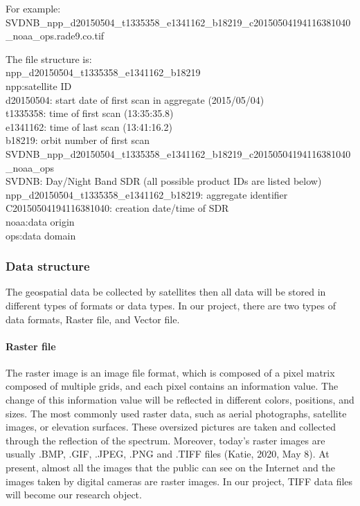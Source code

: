 \documentclass[conference]{IEEEtran}
\begin{document}
For example:
SVDNB\_npp\_d20150504\_t1335358\_e1341162\_b18219\_c20150504194116381040\_noaa\_ops.rade9.co.tif

The file structure is:\\
npp\_d20150504\_t1335358\_e1341162\_b18219\\
npp:satellite ID\\
d20150504: start date of first scan in aggregate (2015/05/04)\\
t1335358: time of first scan (13:35:35.8)\\
e1341162: time of last scan (13:41:16.2)\\
b18219: orbit number of first scan\\

SVDNB\_npp\_d20150504\_t1335358\_e1341162\_b18219\_c20150504194116381040\_noaa\_ops\\
SVDNB: Day/Night Band SDR (all possible product IDs are listed below)\\
npp\_d20150504\_t1335358\_e1341162\_b18219: aggregate identifier\\
C20150504194116381040: creation date/time of SDR\\
noaa:data origin\\
ops:data domain

\subsubsection{Data structure}

The geospatial data be collected by satellites then all data will be stored in different types of formats or data types. 
In our project, there are two types of data formats, Raster file, and Vector file.

\paragraph{Raster file} 

The raster image is an image file format, which is composed of a pixel matrix composed of multiple grids, and each pixel 
contains an information value. The change of this information value will be reflected in different colors, positions, and 
sizes. The most commonly used raster data, such as aerial photographs, satellite images, or elevation surfaces. These 
oversized pictures are taken and collected through the reflection of the spectrum. Moreover, today's raster images are 
usually .BMP, .GIF, .JPEG, .PNG and .TIFF files (Katie, 2020, May 8). At present, almost all the images that the public 
can see on the Internet and the images taken by digital cameras are raster images. In our project, TIFF data files will 
become our research object.
\end{document}
